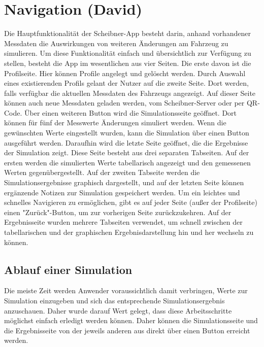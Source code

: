 \chapter{Navigation (David)}
\label{chap:nav}

Die Hauptfunktionalität der Scheibner-App besteht darin, anhand vorhandener Messdaten die Auswirkungen von weiteren Änderungen am Fahrzeug zu simulieren. Um diese Funktionalität einfach und übersichtlich zur Verfügung zu stellen, besteht die App im wesentlichen aus vier Seiten. Die erste davon ist die Profilseite. Hier können Profile angelegt und gelöscht werden. Durch Auswahl eines existierenden Profils gelant der Nutzer auf die zweite Seite. Dort werden, falls verfügbar die aktuellen Messdaten des Fahrzeugs angezeigt. Auf dieser Seite können auch neue Messdaten geladen werden, vom Scheibner-Server oder per QR-Code.
Über einen weiteren Button wird die Simulationsseite geöffnet. Dort können für fünf der Messwerte Änderungen simuliert werden. Wenn die gewünschten Werte eingestellt wurden, kann die Simulation über einen Button ausgeführt werden. Daraufhin wird die letzte Seite geöffnet, die die Ergebnisse der Simulation zeigt. Diese Seite besteht aus drei separaten Tabseiten. Auf der ersten werden die simulierten Werte tabellarisch angezeigt und den gemessenen Werten gegenübergestellt. Auf der zweiten Tabseite werden die Simulationsergebnisse graphisch dargestellt, und auf der letzten Seite können ergänzende Notizen zur Simulation gespeichert werden.
Um ein leichtes und schnelles Navigieren zu ermöglichen, gibt es auf jeder Seite (außer der Profilseite) einen "Zurück"-Button, um zur vorherigen Seite zurückzukehren. Auf der Ergebnisseite wurden mehrere Tabseiten verwendet, um schnell zwischen der tabellarischen und der graphischen Ergebnisdarstellung hin und her wechseln zu können.

	\section{Ablauf einer Simulation}
	\label{sec:sim-ablauf}
    Die meiste Zeit werden Anwender voraussichtlich damit verbringen, Werte zur Simulation einzugeben und sich das entsprechende Simulationsergebnis anzuschauen. Daher wurde darauf Wert gelegt, dass diese Arbeitsschritte möglichst einfach erledigt werden können.
    Daher können die Simulationsseite und die Ergebnisseite von der jeweils anderen aus direkt über einen Button erreicht werden.
	
